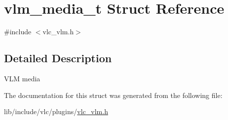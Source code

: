 \hypertarget{structvlm__media__t}{}\section{vlm\+\_\+media\+\_\+t Struct Reference}
\label{structvlm__media__t}


{\ttfamily \#include $<$vlc\+\_\+vlm.\+h$>$}



\subsection{Detailed Description}
V\+LM media 

The documentation for this struct was generated from the following file\+:\begin{DoxyCompactItemize}
\item 
lib/include/vlc/plugins/\hyperlink{vlc__vlm_8h}{vlc\+\_\+vlm.\+h}\end{DoxyCompactItemize}
